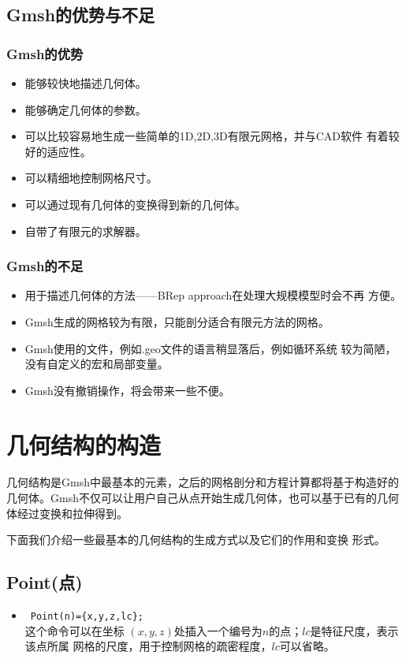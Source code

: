 \documentclass[a4paper,  11pt]{ctexart}
\begin{document}
\subsection{Gmsh的优势与不足}
\subsubsection{Gmsh的优势}
\begin{itemize}
	\item 能够较快地描述几何体。
	\item 能够确定几何体的参数。
	\item 可以比较容易地生成一些简单的1D,2D,3D有限元网格，并与CAD软件
		有着较好的适应性。
	\item 可以精细地控制网格尺寸。
	\item 可以通过现有几何体的变换得到新的几何体。
	\item 自带了有限元的求解器。
\end{itemize}
\subsubsection{Gmsh的不足}
\begin{itemize}
	\item 用于描述几何体的方法——BRep approach在处理大规模模型时会不再
		方便。
	\item Gmsh生成的网格较为有限，只能剖分适合有限元方法的网格。
	\item Gmsh使用的文件，例如.geo文件的语言稍显落后，例如循环系统
		较为简陋，没有自定义的宏和局部变量。
	\item Gmsh没有撤销操作，将会带来一些不便。
\end{itemize}
\newpage
\section{几何结构的构造}
几何结构是Gmsh中最基本的元素，之后的网格剖分和方程计算都将基于构造好的
几何体。Gmsh不仅可以让用户自己从点开始生成几何体，也可以基于已有的几何
体经过变换和拉伸得到。

下面我们介绍一些最基本的几何结构的生成方式以及它们的作用和变换
形式。

\subsection{Point(点)}
\begin{itemize}
\item
~\verb|Point(n)={x,y,z,lc};|~ \\
这个命令可以在坐标
$(x,y,z)$处插入一个编号为$n$的点；$lc$是特征尺度，表示该点所属
网格的尺度，用于控制网格的疏密程度，$lc$可以省略。
\end{itemize}
\end{document}

